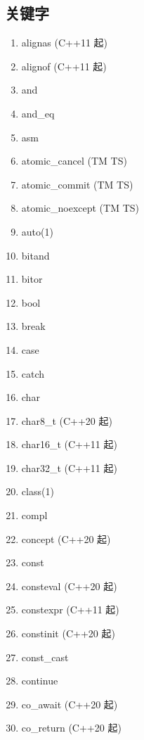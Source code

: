 \begin{appendices}
    \renewcommand{\thechapter}{\Alph{chapter}.}

    \chapter{关键字}

    \newpage

\begin{multicols}{2}
    
    \begin{enumerate}
        \item alignas (C++11 起)
        \item alignof (C++11 起)
        \item and
        \item and\_eq
        \item asm
        \item atomic\_cancel (TM TS)
        \item atomic\_commit (TM TS)
        \item atomic\_noexcept (TM TS)
        \item auto(1)
        \item bitand
        \item bitor
        \item bool
        \item break
        \item case
        \item catch
        \item char
        \item char8\_t (C++20 起)
        \item char16\_t (C++11 起)
        \item char32\_t (C++11 起)
        \item class(1)
        \item compl
        \item concept (C++20 起)
        \item const
        \item consteval (C++20 起)
        \item constexpr (C++11 起)
        \item constinit (C++20 起)
        \item const\_cast
        \item continue
        \item co\_await (C++20 起)
        \item co\_return (C++20 起)

\end{enumerate}
\end{multicols}
\end{appendices}
